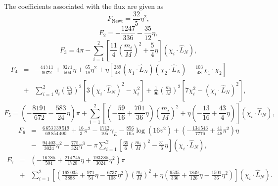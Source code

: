 The coefficients associated with the flux are given as
%
\begin{equation}
%
F_{\textrm{Newt}} = \frac{32}{5}\eta^2,
%
\end{equation} \begin{equation}
%
F_2 = -\frac{1247}{336} - \frac{35}{12}\eta,
%
\end{equation} \begin{equation}
%
F_3 = 4 \pi - \sum_{i=1}^2 \left[ \frac{11}{4} \left(\frac{m_i}{M}\right)^2 
+ \frac{5}{4} \eta \right] \left( \chi_i \cdot \hat{L}_N \right) ,
%
\end{equation} \begin{eqnarray}
%
F_4 &=& -\frac{44\,711}{9072} + \frac{9271}{504}\eta + \frac{65}{18}\eta^2 
+ \eta \left[ \frac{289}{48} \left( \chi_1 \cdot \hat{L}_N\right) \left( \chi_2 \cdot \hat{L}_N\right) 
- \frac{103}{48} \chi_1 \cdot \chi_2 \right] \nonumber\\
 &+& \sum_{i=1}^2 q_i \left( \frac{m_i}{M}\right)^2 \left[ 3 \left( \chi_i \cdot \hat{L}_N \right)^2 - \chi_i^2 \right] 
 + \frac{1}{96}  \left( \frac{m_i}{M}\right)^2  \left[ 7 \chi_i^2 - \left( \chi_i \cdot \hat{L}_N \right)^2 \right] ,
%
\end{eqnarray} \begin{equation}
%
F_5 = \left( -\frac{8191}{672} - \frac{583}{24}\eta \right) \pi +  \sum_{i=1}^2 \left[ \left( -\frac{59}{16} 
+ \frac{701}{36}\eta\right) \left(\frac{m_i}{M}\right)^2 + \eta \left( -\frac{13}{16} 
+ \frac{43}{4}\eta\right) \right] \left( \chi_i \cdot \hat{L}_N \right) ,
%
\end{equation} \begin{eqnarray}
%
F_6 &=& \frac{6\,653\,739\,519}{69\,854\,400} + \frac{16}{3}\pi^2 - \frac{1712}{105}
\gamma_E -\frac{856}{105} \log(16v^2) + \left(-\frac{134\,543}{7776} +
\frac{41}{48}\pi^2\right)\eta \nonumber\\
 &-& \frac{94\,403}{3024}\eta^2 - \frac{775}{324}\eta^3
 - \pi \sum_{i=1}^2 \left[ \frac{65}{6} \left(\frac{m_i}{M}\right)^2 - \frac{31}{6}\eta \right] \left( \chi_i \cdot \hat{L}_N \right),
%
\end{eqnarray} \begin{eqnarray}
%
F_7 &=& \left( -\frac{16\,285}{504} + \frac{214\,745}{1728}\eta +\frac{193\,385}{3024}\eta^2\right)\pi \nonumber\\
 &+& \sum_{i=1}^2 \left[ \left( \frac{162\,035}{3888} + \frac{971}{54}\eta - \frac{6737}{108}\eta^2 \right) \left(\frac{m_i}{M}\right)^2 + \eta \left( \frac{9535}{336} + \frac{1849}{126}\eta - \frac{1501}{36}\eta^2 \right) \right] \left( \chi_i \cdot \hat{L}_N \right) .
%
\end{eqnarray}


